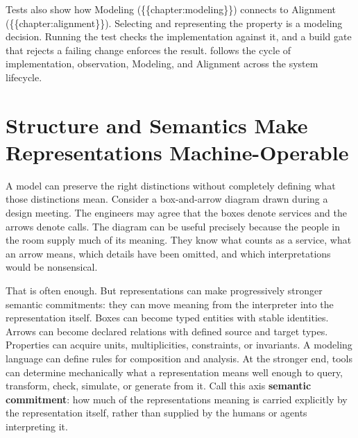 Tests also show how Modeling (\{\{chapter:modeling\}\}) connects to Alignment (\{\{chapter:alignment\}\}). Selecting and representing the property is a modeling decision. Running the test checks the implementation against it, and a build gate that rejects a failing change enforces the result.  follows the cycle of implementation, observation, Modeling, and Alignment across the system lifecycle.

\section{Structure and Semantics Make Representations Machine-Operable}\label{heading:structure-and-semantics-make-representations-machine-operable}



A model can preserve the right distinctions without completely defining what those distinctions mean. Consider a box-and-arrow diagram drawn during a design meeting. The engineers may agree that the boxes denote services and the arrows denote calls. The diagram can be useful precisely because the people in the room supply much of its meaning. They know what counts as a service, what an arrow means, which details have been omitted, and which interpretations would be nonsensical.



That is often enough. But representations can make progressively stronger semantic commitments: they can move meaning from the interpreter into the representation itself. Boxes can become typed entities with stable identities. Arrows can become declared relations with defined source and target types. Properties can acquire units, multiplicities, constraints, or invariants. A modeling language can define rules for composition and analysis. At the stronger end, tools can determine mechanically what a representation means well enough to query, transform, check, simulate, or generate from it. Call this axis \textbf{semantic commitment}: how much of the representation\textquotesingle s meaning is carried explicitly by the representation itself, rather than supplied by the humans or agents interpreting it.

